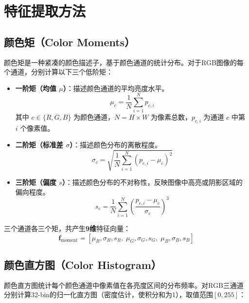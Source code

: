\documentclass[12pt,a4paper]{ctexart}
\begin{document}
\section{特征提取方法}

\subsection{颜色矩（Color Moments）}

颜色矩是一种紧凑的颜色描述子，基于颜色通道的统计分布。对于RGB图像的每个通道，分别计算以下三个低阶矩：

\begin{itemize}
    \item \textbf{一阶矩（均值 $\mu$）}：描述颜色通道的平均亮度水平。
    \begin{equation}
        \mu_c = \frac{1}{N} \sum_{i=1}^{N} p_{c,i}
    \end{equation}
    其中 $c \in \{R,G,B\}$ 为颜色通道，$N = H \times W$ 为像素总数，$p_{c,i}$ 为通道 $c$ 中第 $i$ 个像素值。

    \item \textbf{二阶矩（标准差 $\sigma$）}：描述颜色分布的离散程度。
    \begin{equation}
        \sigma_c = \sqrt{\frac{1}{N} \sum_{i=1}^{N} (p_{c,i} - \mu_c)^2}
    \end{equation}

    \item \textbf{三阶矩（偏度 $s$）}：描述颜色分布的不对称性，反映图像中高亮或阴影区域的偏向程度。
    \begin{equation}
        s_c = \frac{1}{N} \sum_{i=1}^{N} \left(\frac{p_{c,i} - \mu_c}{\sigma_c}\right)^3
    \end{equation}
\end{itemize}

三个通道各三个矩，共产生\textbf{9维}特征向量：
\begin{equation}
    \mathbf{f}_{\text{moment}} = [\mu_R, \sigma_R, s_R,\; \mu_G, \sigma_G, s_G,\; \mu_B, \sigma_B, s_B]
\end{equation}

\subsection{颜色直方图（Color Histogram）}

颜色直方图统计每个颜色通道中像素值在各亮度区间的分布频率。对RGB三通道分别计算32-bin的归一化直方图（密度估计，使积分和为1），取值范围$[0, 255]$：
\end{document}
